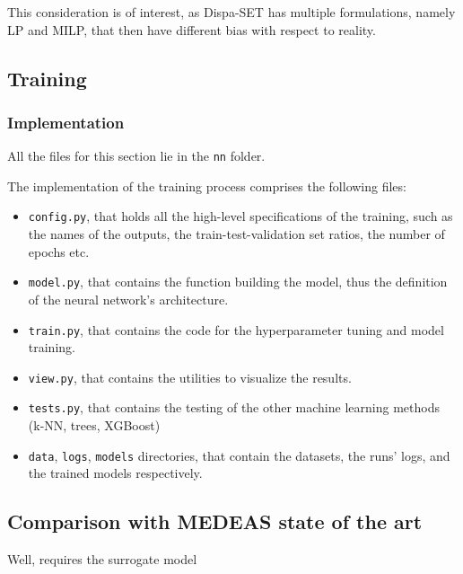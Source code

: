 This consideration is of interest, as Dispa-SET has multiple formulations, namely LP and MILP, that then have different bias with respect to reality.

\subsection{Training}

\subsubsection{Implementation}

All the files for this section lie in the \texttt{nn} folder.

The implementation of the training process comprises the following files:
\begin{itemize}
    \item \texttt{config.py}, that holds all the high-level specifications of the training, such as the names of the outputs, the train-test-validation set ratios, the number of epochs etc.
    \item \texttt{model.py}, that contains the function building the model, thus the definition of the neural network's architecture.
    \item \texttt{train.py}, that contains the code for the hyperparameter tuning and model training.
    \item \texttt{view.py}, that contains the utilities to visualize the results.
    \item \texttt{tests.py}, that contains the testing of the other machine learning methods (k-NN, trees, XGBoost)
    \item \texttt{data}, \texttt{logs}, \texttt{models} directories, that contain the datasets, the runs' logs, and the trained models respectively.
\end{itemize}

\subsection{Comparison with MEDEAS state of the art}

Well, requires the surrogate model

